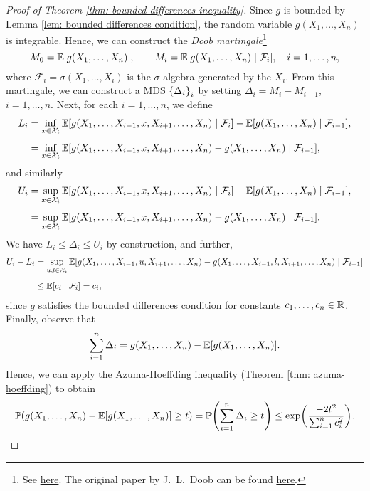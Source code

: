 \begin{proof}[Proof of Theorem \ref{thm: bounded differences inequality}]
Since $g$ is bounded by Lemma \ref{lem: bounded differences condition}, the random variable $g(X_1, \dots, X_n)$ is integrable. Hence, we can construct the \emph{Doob martingale}\footnote{See \href{https://en.wikipedia.org/wiki/Doob_martingale}{here}. The original paper by J.~L.~Doob can be found \href{https://www.ams.org/journals/tran/1940-047-03/S0002-9947-1940-0002052-6/S0002-9947-1940-0002052-6.pdf}{here}.}
\[
    M_0 = \operatorname{\mathbb{E}}[g(X_1, \dots, X_n)], \qquad M_i = \operatorname{\mathbb{E}}[g(X_1, \dots, X_n) \mathrel{|} \mathcal{F}_i], \quad i = 1, \dots, n,
\]
where $\mathcal{F}_i = \sigma(X_1, \dots, X_i)$ is the $\sigma$-algebra generated by the $X_i$. From this martingale, we can construct a MDS $\set{\Delta_i}_i$ by setting $\Delta_i = M_i - M_{i-1}$, $i = 1, \dots, n$. Next, for each $i = 1, \dots, n$, we define
\begin{align*}
    L_i &= \inf_{x \in \mathcal{X}_i} \operatorname{\mathbb{E}}[g(X_1, \dots, X_{i-1}, x, X_{i+1}, \dots, X_n) \mathrel{|} \mathcal{F}_i] - \operatorname{\mathbb{E}}[g(X_1, \dots, X_n) \mathrel{|} \mathcal{F}_{i-1}], \\[4pt]
    &= \inf_{x \in \mathcal{X}_i} \operatorname{\mathbb{E}}[g(X_1, \dots, X_{i-1}, x, X_{i+1}, \dots, X_n) - g(X_1, \dots, X_n) \mathrel{|} \mathcal{F}_{i-1}],
\end{align*}
and similarly
\begin{align*}
    U_i &= \sup_{x \in \mathcal{X}_i} \operatorname{\mathbb{E}}[g(X_1, \dots, X_{i-1}, x, X_{i+1}, \dots, X_n) \mathrel{|} \mathcal{F}_i] - \operatorname{\mathbb{E}}[g(X_1, \dots, X_n) \mathrel{|} \mathcal{F}_{i-1}], \\[4pt]
    &= \sup_{x \in \mathcal{X}_i} \operatorname{\mathbb{E}}[g(X_1, \dots, X_{i-1}, x, X_{i+1}, \dots, X_n) - g(X_1, \dots, X_n) \mathrel{|} \mathcal{F}_{i-1}].
\end{align*}
We have $L_i \leq \Delta_i \leq U_i$ by construction, and further,
\begin{align*}
    U_i - L_i &= \sup_{u, l \in \mathcal{X}_i} \operatorname{\mathbb{E}}[g(X_1, \dots, X_{i-1}, u, X_{i+1}, \dots, X_n) - g(X_1, \dots, X_{i-1}, l, X_{i+1}, \dots, X_n) \mathrel{|} \mathcal{F}_{i-1}] \\[4pt]
    &\leq \operatorname{\mathbb{E}}[c_i \mathrel{|} \mathcal{F}_i] = c_i,
\end{align*}
since $g$ satisfies the bounded differences condition for constants $c_1, \dots, c_n \in \mathbb{R}$. Finally, observe that
\[
    \sum_{i=1}^n \Delta_i = g(X_1, \dots, X_n) - \operatorname{\mathbb{E}}[g(X_1, \dots, X_n)].
\]
Hence, we can apply the Azuma-Hoeffding inequality (Theorem \ref{thm: azuma-hoeffding}) to obtain
\[
    \Prob(g(X_1, \dots, X_n) - \Exp[g(X_1, \dots, X_n)] \geq t) = \Prob\left(\sum_{i=1}^n \Delta_i \geq t\right) \leq \exp(\frac{-2t^2}{\sum_{i=1}^n c_i^2}). \qedhere
\]
\end{proof}

